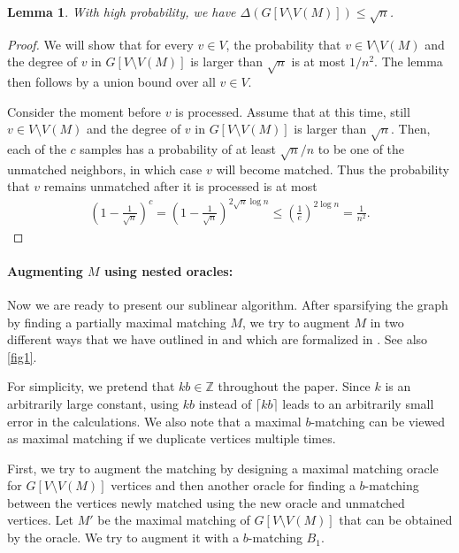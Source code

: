 \documentclass[letterpaper,11pt]{article}
\newtheorem{lemma}{Lemma}[section]
\begin{document}
\begin{lemma}\label{lem:sparsification-maximal}
    With high probability, we have $\Delta(G[V \setminus V(M)]) \leq \sqrt{n}$.
\end{lemma}
\begin{proof}
    We will show that for every $v \in V$, the probability that $v \in V \setminus V(M)$ and the degree of $v$ in $G[V \setminus V(M)]$ is larger than $\sqrt{n}$
    is at most $1/n^2$. The lemma then follows by a union bound over all $v \in V$.

    Consider the moment before $v$ is processed. Assume that at this time, still $v \in V \setminus V(M)$ and the degree of $v$ in $G[V \setminus V(M)]$ is larger than $\sqrt{n}$. Then, each of the $c$ samples has a probability of at least $\sqrt{n}/n$ to be one of the unmatched neighbors, in which case $v$ will become matched. Thus the probability that $v$ remains unmatched after it is processed is at most
    \begin{align*}
        \left(1 - \frac{1}{\sqrt{n}}\right)^c = \left(1 - \frac{1}{\sqrt{n}}\right)^{2\sqrt{n} \log n} \leq \left( \frac{1}{e}\right)^{2\log n} = \frac{1}{n^2}.
    \end{align*}
\end{proof}


\paragraph{Augmenting $M$ using nested oracles:} Now we are ready to present our sublinear algorithm. After sparsifying the graph by finding a partially maximal matching $M$, we try to augment $M$ in two different ways that
we have outlined in 
and which
are formalized in .
See also \cref{fig1}.

For simplicity, we pretend that $kb \in \mathbb{Z}$ throughout the paper. Since $k$ is an arbitrarily large constant, using $kb$ instead of $\lceil kb \rceil$ leads to an arbitrarily small error in the calculations.
We also note that a maximal $b$-matching can be viewed as maximal matching if we duplicate vertices multiple times. 




First, we try to augment the matching by designing a maximal matching oracle for $G[V \setminus V(M)]$ vertices and then another oracle for finding a $b$-matching between the vertices newly matched using the new oracle and unmatched vertices. Let $M'$ be the maximal matching of $G[V \setminus V(M)]$ that can be obtained by the oracle. We try to augment it with a $b$-matching $B_1$.
\end{document}
